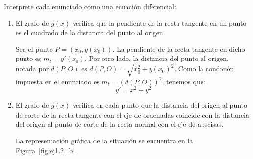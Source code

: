 \begin{ejercicio} \label{ej:1.2}
    Interprete cada enunciado como una ecuación diferencial:
    \begin{enumerate}
        \item El grafo de \(y(x)\) verifica que la pendiente de la recta tangente en un punto es el cuadrado de la distancia del punto al origen.
        
        Sea el punto \(P=(x_0, y(x_0))\). La pendiente de la recta tangente en dicho punto es \(m_t = y'(x_0)\).
        Por otro lado, la distancia del punto al origen, notada por $d(P, O)$ es \(d(P, O)=\sqrt{x_0^2 + y(x_0)^2}\). Como la condición impuesta en el enunciado es $m_t=(d(P, O))^2$, tenemos que:
        \begin{equation*}
            y'= x^2 + y^2
        \end{equation*}
        \item \label{ej:1.2_b}
        El grafo de \(y(x)\) verifica en cada punto que la distancia del origen al punto de corte de la recta tangente con el eje de ordenadas coincide con la distancia del origen al punto de corte de la recta normal con el eje de abscisas.
        
        La representación gráfica de la situación se encuentra en la Figura~\ref{fig:ej1.2_b}.
        \begin{figure}
            \centering
\end{figure}
\end{enumerate}
\end{ejercicio}

